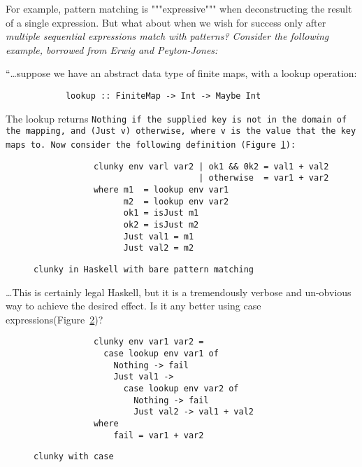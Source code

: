 \documentclass[manuscript,screen,review, 12pt]{acmart}
\begin{document}
\begin{outline}[enumerate]
            For example, pattern matching is """expressive""" when
            deconstructing the result of a single expression. But what about
            when we wish for success only after \it{multiple sequential
            expressions} match with patterns? Consider the following
            example, borrowed from Erwig and Peyton-Jones: 


    “\dots suppose we have an abstract data type of finite maps, with a lookup
    operation:
    
    \begin{center}
        \begin{verbatim}
            lookup :: FiniteMap -> Int -> Maybe Int
        \end{verbatim}
    \end{center}

    The lookup returns \tt{Nothing} if the supplied key is not in the domain of
    the mapping, and \tt{(Just v)} otherwise, where \tt{v} is the value that the
    key maps to. Now consider the following definition
    (Figure~\ref{fig:whereclunky}):

    \begin{figure}[hbt!]
        \begin{verbatim}
            clunky env varl var2 | ok1 && 0k2 = val1 + val2 
                                 | otherwise  = var1 + var2 
            where m1  = lookup env var1 
                  m2  = lookup env var2
                  ok1 = isJust m1 
                  ok2 = isJust m2 
                  Just val1 = m1 
                  Just val2 = m2    
        \end{verbatim}
    \caption{\tt{clunky} in Haskell with bare pattern matching} 
    \label{fig:whereclunky}
    \end{figure}
        
    \dots This is certainly legal Haskell, but it is a tremendously verbose and
    un-obvious way to achieve the desired effect. Is it any better using case
    expressions(Figure~\ref{fig:caseclunky})?

    
    \begin{figure}[hbt!]
        \begin{verbatim}
            clunky env var1 var2 = 
              case lookup env var1 of 
                Nothing -> fail 
                Just val1 -> 
                  case lookup env var2 of 
                    Nothing -> fail 
                    Just val2 -> val1 + val2
            where 
                fail = var1 + var2
        \end{verbatim}
    \caption{\tt{clunky} with \tt{case}} 
    \label{fig:caseclunky}
    \end{figure}
    

\end{outline}
\end{document}
